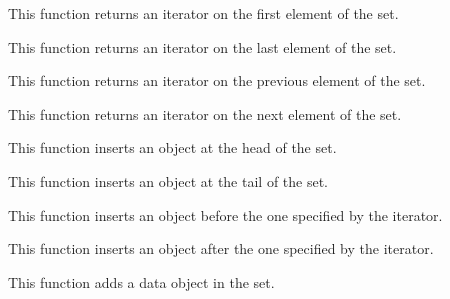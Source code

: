 	  {This function returns an iterator on the first element
	    of the set.}

	  {This function returns an iterator on the last element of
	    the set.}

	  {This function returns an iterator on the previous element
	    of the set.}

	  {This function returns an iterator on the next element
	    of the set.}

	  {This function inserts an object at the head of the set.}

	  {This function inserts an object at the tail of the set.}

	  {This function inserts an object before the one specified
	    by the iterator.}

	  {This function inserts an object after the one specified
	    by the iterator.}

	  {This function adds a data object in the set.}

